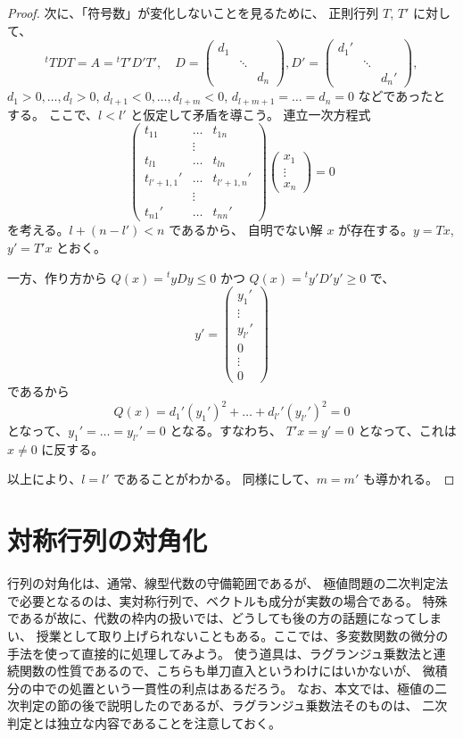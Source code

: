 \documentclass[a4paper]{jsarticle}
\theoremstyle{definition}
\theoremstyle{remark}
\begin{document}
\begin{proof}
次に、「符号数」が変化しないことを見るために、
正則行列 $T$, $T'$ に対して、
\[
{}^tTDT = A = {}^tT'D'T', 
\quad 
D = 
\begin{pmatrix}
d_1 & &\\
 & \ddots & \\
 &        & d_n
\end{pmatrix}, 
D' = 
\begin{pmatrix}
d_1' & &\\
 & \ddots & \\
 &        & d_n'
\end{pmatrix}, 
\]
$d_1>0, \dots, d_l>0$, $d_{l+1}<0, \dots, d_{l+m}<0$, 
$d_{l+m+1} = \dots = d_n = 0$ などであったとする。
ここで、$l < l'$ と仮定して矛盾を導こう。
連立一次方程式
\[
\begin{pmatrix}
t_{11} & \dots & t_{1n}\\
 & \vdots & \\
t_{l1} & \dots & t_{ln}\\
t_{l'+1,1}' & \dots & t_{l'+1,n}'\\
 & \vdots & \\
t_{n1}' & \dots & t_{nn}'
\end{pmatrix}
\begin{pmatrix}
x_1\\ 
\vdots\\
x_n
\end{pmatrix}
= 0
\]
を考える。$l + (n-l') < n$ であるから、
自明でない解 $x$ が存在する。$y = Tx$, $y' = T'x$ とおく。

一方、作り方から $Q(x) = {}^tyDy \leq 0$ かつ $Q(x) = {}^ty' D' y' \geq 0$ で、
\[
y' = 
\begin{pmatrix}
y_1'\\
\vdots\\
y_{l'}'\\
0\\
\vdots\\
0
\end{pmatrix}
\]
であるから
\[
Q(x) = d_1'(y_1')^2 + \dots + d_{l'}'(y_{l'}')^2 = 0
\]
となって、$y_1' = \dots = y_{l'}' = 0$ となる。すなわち、
$T'x = y' = 0$ となって、これは $x \not= 0$ に反する。

以上により、$l = l'$ であることがわかる。
同様にして、$m = m'$ も導かれる。
\end{proof}


\section{対称行列の対角化}
行列の対角化は、通常、線型代数の守備範囲であるが、
極値問題の二次判定法で必要となるのは、実対称行列で、ベクトルも成分が実数の場合である。
特殊であるが故に、代数の枠内の扱いでは、どうしても後の方の話題になってしまい、
授業として取り上げられないこともある。ここでは、多変数関数の微分の手法を使って直接的に処理してみよう。
使う道具は、ラグランジュ乗数法と連続関数の性質であるので、こちらも単刀直入というわけにはいかないが、
微積分の中での処置という一貫性の利点はあるだろう。
なお、本文では、極値の二次判定の節の後で説明したのであるが、ラグランジュ乗数法そのものは、
二次判定とは独立な内容であることを注意しておく。
\end{document}

